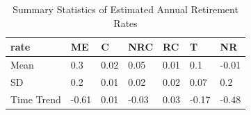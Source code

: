 \begin{table}[H]
\caption{Summary Statistics of Estimated Annual Retirement Rates}
\label{table:retirments_rates}
\centering
\begin{tabular}[t]{lllllll}
\toprule
rate & ME & C & NRC & RC & T & NR\\
\midrule
Mean & 0.3 & 0.02 & 0.05 & 0.01 & 0.1 & -0.01\\
SD & 0.2 & 0.01 & 0.02 & 0.02 & 0.07 & 0.2\\
Time Trend & -0.61 & 0.01 & -0.03 & 0.03 & -0.17 & -0.48\\
\bottomrule
\end{tabular}
\end{table}
